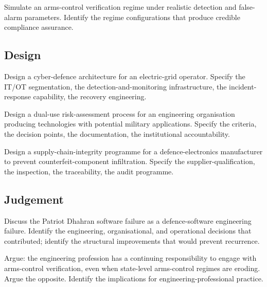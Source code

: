 \begin{exercise}
Simulate an arms-control verification regime under realistic detection and false-alarm parameters. Identify the regime configurations that produce credible compliance assurance.
\end{exercise}

\subsection*{Design}

\begin{exercise}
Design a cyber-defence architecture for an electric-grid operator. Specify the IT/OT segmentation, the detection-and-monitoring infrastructure, the incident-response capability, the recovery engineering.
\end{exercise}

\begin{exercise}
Design a dual-use risk-assessment process for an engineering organisation producing technologies with potential military applications. Specify the criteria, the decision points, the documentation, the institutional accountability.
\end{exercise}

\begin{exercise}
Design a supply-chain-integrity programme for a defence-electronics manufacturer to prevent counterfeit-component infiltration. Specify the supplier-qualification, the inspection, the traceability, the audit programme.
\end{exercise}

\subsection*{Judgement}

\begin{exercise}
Discuss the Patriot Dhahran software failure as a defence-software engineering failure. Identify the engineering, organisational, and operational decisions that contributed; identify the structural improvements that would prevent recurrence.
\end{exercise}

\begin{exercise}
Argue: the engineering profession has a continuing responsibility to engage with arms-control verification, even when state-level arms-control regimes are eroding. Argue the opposite. Identify the implications for engineering-professional practice.
\end{exercise}

